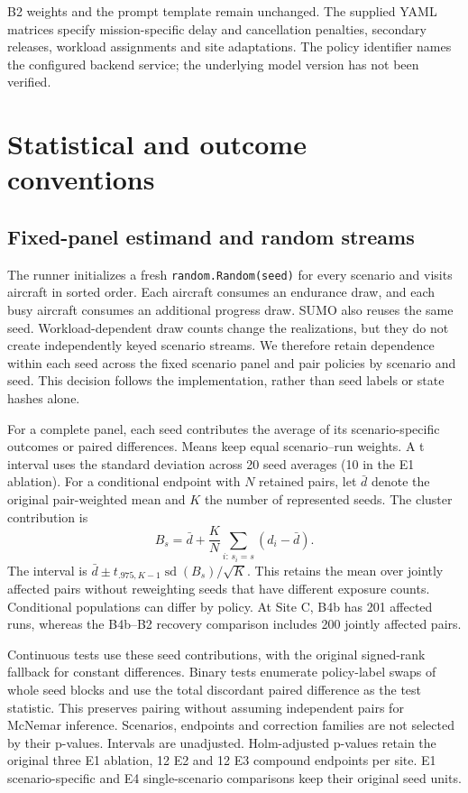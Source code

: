 \documentclass[11pt,a4paper]{article}
\begin{document}
B2 weights and the prompt template remain unchanged. The supplied YAML matrices specify mission-specific delay and cancellation penalties, secondary releases, workload assignments and site adaptations. The policy identifier names the configured backend service; the underlying model version has not been verified.

\section{Statistical and outcome conventions}

\subsection{Fixed-panel estimand and random streams}

The runner initializes a fresh \nolinkurl{random.Random(seed)} for every scenario and visits aircraft in sorted order. Each aircraft consumes an endurance draw, and each busy aircraft consumes an additional progress draw. SUMO also reuses the same seed. Workload-dependent draw counts change the realizations, but they do not create independently keyed scenario streams. We therefore retain dependence within each seed across the fixed scenario panel and pair policies by scenario and seed. This decision follows the implementation, rather than seed labels or state hashes alone.

For a complete panel, each seed contributes the average of its scenario-specific outcomes or paired differences. Means keep equal scenario--run weights. A t interval uses the standard deviation across 20 seed averages (10 in the E1 ablation). For a conditional endpoint with $N$ retained pairs, let $\bar d$ denote the original pair-weighted mean and $K$ the number of represented seeds. The cluster contribution is
\[
B_s=\bar d+\frac{K}{N}\sum_{i:\,s_i=s}(d_i-\bar d).
\]
The interval is $\bar d\pm t_{.975,K-1}\operatorname{sd}(B_s)/\sqrt K$. This retains the mean over jointly affected pairs without reweighting seeds that have different exposure counts. Conditional populations can differ by policy. At Site C, B4b has 201 affected runs, whereas the B4b--B2 recovery comparison includes 200 jointly affected pairs.

Continuous tests use these seed contributions, with the original signed-rank fallback for constant differences. Binary tests enumerate policy-label swaps of whole seed blocks and use the total discordant paired difference as the test statistic. This preserves pairing without assuming independent pairs for McNemar inference. Scenarios, endpoints and correction families are not selected by their p-values. Intervals are unadjusted. Holm-adjusted p-values retain the original three E1 ablation, 12 E2 and 12 E3 compound endpoints per site. E1 scenario-specific and E4 single-scenario comparisons keep their original seed units.
\end{document}
